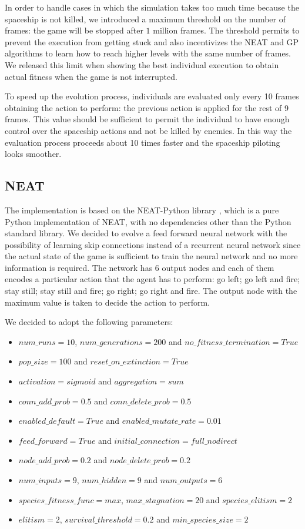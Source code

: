 In order to handle cases in which the simulation takes too much time because the spaceship
is not killed, we introduced a maximum threshold on the number of frames: the game will be
stopped after $1$ million frames. The threshold permits to prevent the execution from getting
stuck and also incentivizes the NEAT and GP algorithms to learn how to reach higher levels
with the same number of frames. We released this limit when showing the best individual
execution to obtain actual fitness when the game is not interrupted.

To speed up the evolution process, individuals are evaluated only every 10 frames obtaining
the action to perform: the previous action is applied for the rest of 9 frames. This value
should be sufficient to permit the individual to have enough control over the spaceship
actions and not be killed by enemies. In this way the evaluation process proceeds about 10
times faster and the spaceship piloting looks smoother.

\subsection{NEAT}
The implementation is based on the NEAT-Python library \cite{NEAT-Python}, which is a pure Python
implementation of NEAT, with no dependencies other than the Python standard library.
We decided to evolve a feed forward neural network with the possibility of learning skip
connections instead of a recurrent neural network since the actual state of the game is
sufficient to train the neural network and no more information is required. The network has 6
output nodes and each of them encodes a particular action that the agent has to perform:
go left; go left and fire; stay still; stay still and fire; go right; go right and fire.
The output node with the maximum value is taken to decide the action to perform.

We decided to adopt the following parameters:
\begin{itemize}
    \item $num\_runs = 10$, $num\_generations = 200$ and $no\_fitness\_termination = True$
    \item $pop\_size = 100$ and $reset\_on\_extinction = True$
    \item $activation = sigmoid$ and $aggregation = sum$
    \item $conn\_add\_prob = 0.5$ and $conn\_delete\_prob = 0.5$
    \item $enabled\_default = True$ and $enabled\_mutate\_rate = 0.01$
    \item $feed\_forward = True$ and $initial\_connection = full\_nodirect$
    \item $node\_add\_prob = 0.2$ and $node\_delete\_prob = 0.2$
    \item $num\_inputs = 9$, $num\_hidden = 9$ and $num\_outputs = 6$
    \item $species\_fitness\_func = max$, $max\_stagnation = 20$ and $species\_elitism = 2$
    \item $elitism = 2$, $survival\_threshold = 0.2$ and $min\_species\_size = 2$
\end{itemize}

